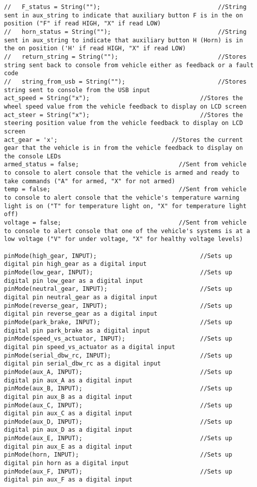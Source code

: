 \begin{lstlisting}[breaklines=true,basicstyle=\tiny]
//   F_status = String("");                                 //String sent in aux_string to indicate that auxiliary button F is in the on position ("F" if read HIGH, "X" if read LOW)
//   horn_status = String("");                              //String sent in aux_string to indicate that auxiliary button H (Horn) is in the on position ('H' if read HIGH, "X" if read LOW)
//   return_string = String("");                            //Stores string sent back to console from vehicle either as feedback or a fault code
//   string_from_usb = String("");                          //Stores string sent to console from the USB input 
act_speed = String("x");                               //Stores the wheel speed value from the vehicle feedback to display on LCD screen
act_steer = String("x");                               //Stores the steering position value from the vehicle feedback to display on LCD screen
act_gear = 'x';                                //Stores the current gear that the vehicle is in from the vehicle feedback to display on the console LEDs
armed_status = false;                            //Sent from vehicle to console to alert console that the vehicle is armed and ready to take commands ("A" for armed, "X" for not armed)
temp = false;                                    //Sent from vehicle to console to alert console that the vehicle's temperature warning light is on ("T" for temperature light on, "X" for temperature light off)
voltage = false;                                 //Sent from vehicle to console to alert console that one of the vehicle's systems is at a low voltage ("V" for under voltage, "X" for healthy voltage levels)

pinMode(high_gear, INPUT);                             //Sets up digital pin high_gear as a digital input 
pinMode(low_gear, INPUT);                              //Sets up digital pin low_gear as a digital input 
pinMode(neutral_gear, INPUT);                          //Sets up digital pin neutral_gear as a digital input 
pinMode(reverse_gear, INPUT);                          //Sets up digital pin reverse_gear as a digital input 
pinMode(park_brake, INPUT);                            //Sets up digital pin park_brake as a digital input 
pinMode(speed_vs_actuator, INPUT);                     //Sets up digital pin speed_vs_actuator as a digital input 
pinMode(serial_dbw_rc, INPUT);                         //Sets up digital pin serial_dbw_rc as a digital input 
pinMode(aux_A, INPUT);                                 //Sets up digital pin aux_A as a digital input 
pinMode(aux_B, INPUT);                                 //Sets up digital pin aux_B as a digital input 
pinMode(aux_C, INPUT);                                 //Sets up digital pin aux_C as a digital input 
pinMode(aux_D, INPUT);                                 //Sets up digital pin aux_D as a digital input 
pinMode(aux_E, INPUT);                                 //Sets up digital pin aux_E as a digital input 
pinMode(horn, INPUT);                                  //Sets up digital pin horn as a digital input 
pinMode(aux_F, INPUT);                                 //Sets up digital pin aux_F as a digital input 


\end{lstlisting}
